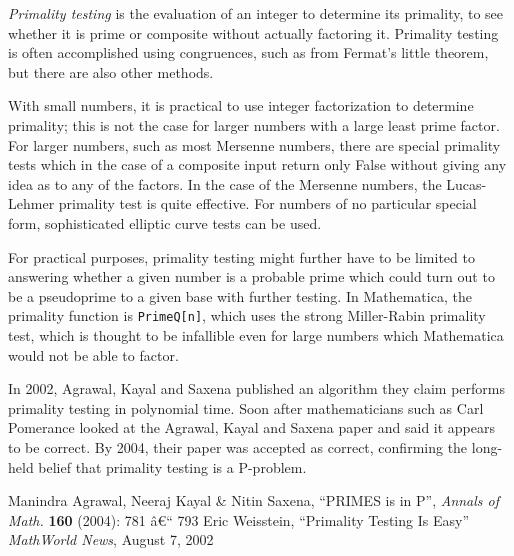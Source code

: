 \documentclass[12pt]{article}
\begin{document}
{\em Primality testing} is the evaluation of an integer to determine its primality, to see whether it is prime or composite without actually factoring it. Primality testing is often accomplished using congruences, such as from Fermat's little theorem, but there are also other methods.

With small numbers, it is practical to use integer factorization to determine primality; this is not the case for larger numbers with a large least prime factor. For larger numbers, such as most Mersenne numbers, there are special primality tests which in the case of a composite input return only False without giving any idea as to any of the factors. In the case of the Mersenne numbers, the Lucas-Lehmer primality test is quite effective. For numbers of no particular special form, sophisticated elliptic curve tests can be used.

For practical purposes, primality testing might further have to be limited to answering whether a given number is a probable prime which could turn out to be a pseudoprime to a given base with further testing. In Mathematica, the primality function is \verb=PrimeQ[n]=, which uses the strong Miller-Rabin primality test, which is thought to be infallible even for large numbers which Mathematica would not be able to factor.

In 2002, Agrawal, Kayal and Saxena published an algorithm they claim performs primality testing in polynomial time. Soon after mathematicians such as Carl Pomerance looked at the Agrawal, Kayal and Saxena paper and said it appears to be correct. By 2004, their paper was accepted as correct, confirming the long-held belief that primality testing is a P-problem.

\begin{thebibliography}{2}
 Manindra Agrawal, Neeraj Kayal \& Nitin Saxena, ``PRIMES is in P'', {\it Annals of Math.} {\bf 160} (2004): 781 â€“ 793
 Eric Weisstein, ``Primality Testing Is Easy'' {\it MathWorld News}, August 7, 2002
\end{thebibliography}
\end{document}
